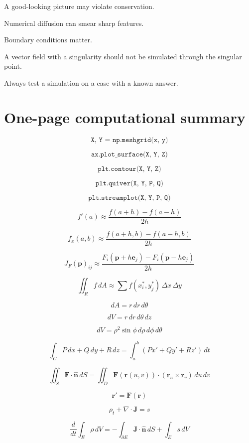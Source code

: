 A good-looking picture may violate conservation.

Numerical diffusion can smear sharp features.

Boundary conditions matter.

A vector field with a singularity should not be simulated through the singular point.

Always test a simulation on a case with a known answer.

\section*{One-page computational summary}

\[
\boxed{
    \texttt{X, Y = np.meshgrid(x, y)}
}
\]

\[
\boxed{
    \texttt{ax.plot\_surface(X, Y, Z)}
}
\]

\[
\boxed{
    \texttt{plt.contour(X, Y, Z)}
}
\]

\[
\boxed{
    \texttt{plt.quiver(X, Y, P, Q)}
}
\]

\[
\boxed{
    \texttt{plt.streamplot(X, Y, P, Q)}
}
\]

\[
\boxed{
    f'(a)\approx\frac{f(a+h)-f(a-h)}{2h}
}
\]

\[
\boxed{
    f_x(a,b)\approx\frac{f(a+h,b)-f(a-h,b)}{2h}
}
\]

\[
\boxed{
    J_F(\mathbf p)_{ij}
    \approx
    \frac{F_i(\mathbf p+h\mathbf e_j)-F_i(\mathbf p-h\mathbf e_j)}{2h}
}
\]

\[
\boxed{
    \iint_R f\,dA
    \approx
    \sum f(x_i^*,y_j^*)\,\Delta x\,\Delta y
}
\]

\[
\boxed{
    dA=r\,dr\,d\theta
}
\]

\[
\boxed{
    dV=r\,dr\,d\theta\,dz
}
\]

\[
\boxed{
    dV=\rho^2\sin\phi\,d\rho\,d\phi\,d\theta
}
\]

\[
\boxed{
    \int_C P\,dx+Q\,dy+R\,dz
    =
    \int_a^b(Px'+Qy'+Rz')\,dt
}
\]

\[
\boxed{
    \iint_S\mathbf F\cdot\widehat{\mathbf n}\,dS
    =
    \iint_D
    \mathbf F(\mathbf r(u,v))\cdot(\mathbf r_u\times\mathbf r_v)
    \,du\,dv
}
\]

\[
\boxed{
    \mathbf r'=\mathbf F(\mathbf r)
}
\]

\[
\boxed{
    \rho_t+\nabla\cdot\mathbf J=s
}
\]

\[
\boxed{
    \frac{d}{dt}\int_E\rho\,dV
    =
    -\int_{\partial E}\mathbf J\cdot\widehat{\mathbf n}\,dS
    +
    \int_E s\,dV
}
\]